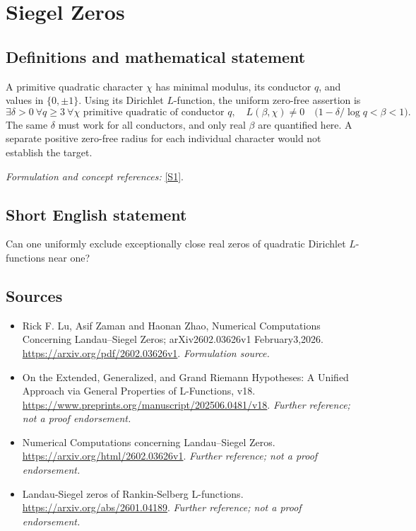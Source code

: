 \documentclass[11pt]{article}
\begin{document}
\section*{\texorpdfstring{Siegel Zeros}{Siegel Zeros}}\label{1509}
\subsection{Definitions and mathematical statement}
A primitive quadratic character $\chi$ has minimal modulus, its conductor $q$, and values in $\{0,\pm1\}$. Using its Dirichlet $L$-function, the uniform zero-free assertion is
\[
 \exists\delta>0\ \forall q\ge3\ \forall\chi\text{ primitive quadratic of conductor }q,
 \quad L(\beta,\chi)\ne0\quad\bigl(1-\delta/\log q<\beta<1\bigr).
\]
The same $\delta$ must work for all conductors, and only real $\beta$ are quantified here. A separate positive zero-free radius for each individual character would not establish the target.
\par\smallskip\textit{Formulation and concept references:} \href{https://arxiv.org/pdf/2602.03626v1}{[S1]}.

\subsection{Short English statement}
Can one uniformly exclude exceptionally close real zeros of quadratic Dirichlet $L$-functions near one?
\subsection{Sources}
\begin{itemize}
\item[S1]Rick F. Lu, Asif Zaman and Haonan Zhao, Numerical Computations Concerning Landau–Siegel Zeros; arXiv2602.03626v1 February3,2026.
\url{https://arxiv.org/pdf/2602.03626v1}.
\textit{Formulation source.}
\item[S2]On the Extended, Generalized, and Grand Riemann Hypotheses: A Unified Approach via General Properties of L-Functions, v18.
\url{https://www.preprints.org/manuscript/202506.0481/v18}.
\textit{Further reference; not a proof endorsement.}
\item[S3]Numerical Computations concerning Landau–Siegel Zeros.
\url{https://arxiv.org/html/2602.03626v1}.
\textit{Further reference; not a proof endorsement.}
\item[S4]Landau-Siegel zeros of Rankin-Selberg L-functions.
\url{https://arxiv.org/abs/2601.04189}.
\textit{Further reference; not a proof endorsement.}
\end{itemize}
\end{document}

